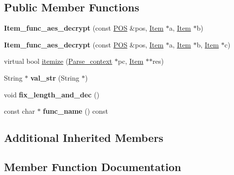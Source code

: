 \subsection*{Public Member Functions}
\begin{DoxyCompactItemize}
\item 
\mbox{\label{classItem__func__aes__decrypt_a598bbbdb805387251220c3cff9697c33}} 
{\bfseries Item\+\_\+func\+\_\+aes\+\_\+decrypt} (const \mbox{\hyperlink{structYYLTYPE}{P\+OS}} \&pos, \mbox{\hyperlink{classItem}{Item}} $\ast$a, \mbox{\hyperlink{classItem}{Item}} $\ast$b)
\item 
\mbox{\label{classItem__func__aes__decrypt_a4f2c2aec80087e988e0eb8c7caad12be}} 
{\bfseries Item\+\_\+func\+\_\+aes\+\_\+decrypt} (const \mbox{\hyperlink{structYYLTYPE}{P\+OS}} \&pos, \mbox{\hyperlink{classItem}{Item}} $\ast$a, \mbox{\hyperlink{classItem}{Item}} $\ast$b, \mbox{\hyperlink{classItem}{Item}} $\ast$c)
\item 
virtual bool \mbox{\hyperlink{classItem__func__aes__decrypt_aba543513adc92c354596ad9d3b81ba9c}{itemize}} (\mbox{\hyperlink{structParse__context}{Parse\+\_\+context}} $\ast$pc, \mbox{\hyperlink{classItem}{Item}} $\ast$$\ast$res)
\item 
\mbox{\label{classItem__func__aes__decrypt_a1b4d161947c33ad13241957b0c22638f}} 
String $\ast$ {\bfseries val\+\_\+str} (String $\ast$)
\item 
\mbox{\label{classItem__func__aes__decrypt_ab4597ce39fa24da5e8c96da8b8657848}} 
void {\bfseries fix\+\_\+length\+\_\+and\+\_\+dec} ()
\item 
\mbox{\label{classItem__func__aes__decrypt_a0149f82459e849ae4966ef295232f1ad}} 
const char $\ast$ {\bfseries func\+\_\+name} () const
\end{DoxyCompactItemize}
\subsection*{Additional Inherited Members}


\subsection{Member Function Documentation}
\mbox{\label{classItem__func__aes__decrypt_aba543513adc92c354596ad9d3b81ba9c}} 
